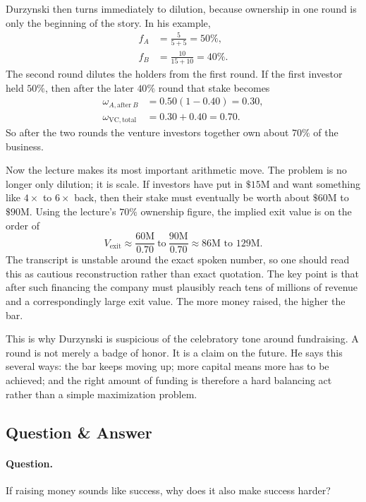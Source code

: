 Durzynski then turns immediately to dilution, because ownership in one round is only the beginning of the story. In his example,
\begin{align}
f_A &= \frac{5}{5+5} = 50\%, \\
f_B &= \frac{10}{15+10} = 40\%.
\end{align}
The second round dilutes the holders from the first round. If the first investor held \(50\%\), then after the later \(40\%\) round that stake becomes
\begin{align}
\omega_{A,\mathrm{after}\ B} &= 0.50(1-0.40)=0.30, \\
\omega_{\mathrm{VC,total}} &= 0.30 + 0.40 = 0.70.
\end{align}
So after the two rounds the venture investors together own about \(70\%\) of the business.

Now the lecture makes its most important arithmetic move. The problem is no longer only dilution; it is scale. If investors have put in \(\$15\text{M}\) and want something like \(4\times\) to \(6\times\) back, then their stake must eventually be worth about \(\$60\text{M}\) to \(\$90\text{M}\). Using the lecture's \(70\%\) ownership figure, the implied exit value is on the order of
\begin{equation}
V_{\mathrm{exit}} \approx \frac{60\text{M}}{0.70}\ \text{to}\ \frac{90\text{M}}{0.70}
\approx 86\text{M to }129\text{M}.
\end{equation}
The transcript is unstable around the exact spoken number, so one should read this as cautious reconstruction rather than exact quotation. The key point is that after such financing the company must plausibly reach tens of millions of revenue and a correspondingly large exit value. The more money raised, the higher the bar.

This is why Durzynski is suspicious of the celebratory tone around fundraising. A round is not merely a badge of honor. It is a claim on the future. He says this several ways: the bar keeps moving up; more capital means more has to be achieved; and the right amount of funding is therefore a hard balancing act rather than a simple maximization problem.

\subsection{Question \& Answer}

\paragraph{Question.}
If raising money sounds like success, why does it also make success harder?

